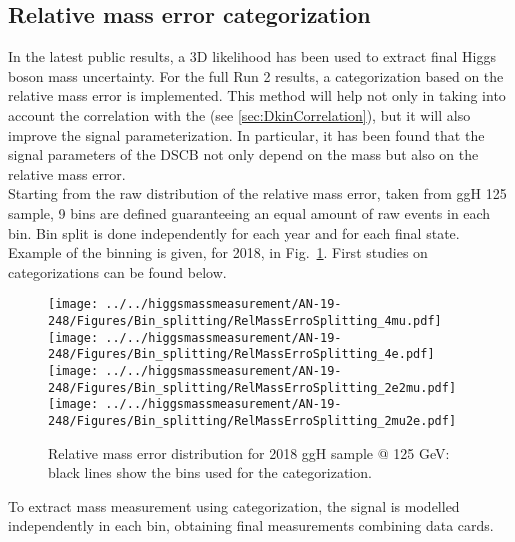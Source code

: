 \subsection{Relative mass error categorization}
\label{sec:SignalParam_N_2D}
In the latest public results, %
a 3D likelihood has been used to extract final Higgs boson mass uncertainty. 
For the full Run 2 results, a categorization based on the relative mass error is implemented.
This method will help not only in taking into account the correlation with the \Dkinbkg (see \ref{sec:DkinCorrelation}), but it will also improve the signal parameterization.
In particular, it has been found that the signal parameters of the DSCB not only depend on the mass but also on the relative mass error.\\
Starting from the raw distribution of the relative mass error, taken from ggH 125 \GeV sample, 
9 bins are defined guaranteeing an equal amount of raw events in each bin. Bin split 
is done independently for each year and for each final state. Example of the binning is given, 
for 2018, in  Fig.~\ref{Bin_splitting_2018}. First studies on categorizations can be found below. %
\begin{figure}[!htbp]
\begin{center}
	\texttt{[image: ../../higgsmassmeasurement/AN-19-248/Figures/Bin\_splitting/RelMassErroSplitting\_4mu.pdf]}
	\texttt{[image: ../../higgsmassmeasurement/AN-19-248/Figures/Bin\_splitting/RelMassErroSplitting\_4e.pdf]}
  	\texttt{[image: ../../higgsmassmeasurement/AN-19-248/Figures/Bin\_splitting/RelMassErroSplitting\_2e2mu.pdf]}
	\texttt{[image: ../../higgsmassmeasurement/AN-19-248/Figures/Bin\_splitting/RelMassErroSplitting\_2mu2e.pdf]}
\caption{
	Relative mass error distribution for 2018 ggH sample @ 125 GeV: black lines show 
	the bins used for the categorization.}
\label{Bin_splitting_2018}
\end{center}
\end{figure}
To extract mass measurement using categorization, the signal is modelled independently in each bin, 
obtaining final measurements combining data cards. \\

